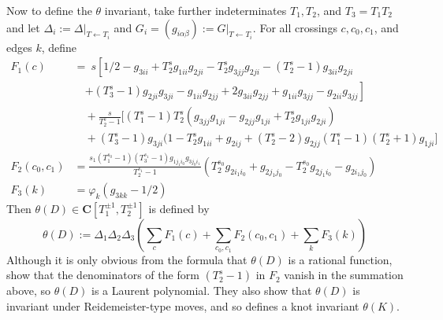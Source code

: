 \documentclass{amsart}
\begin{document}
Now to define the $\theta$ invariant, take further
indeterminates $T_1,T_2$, and $T_3=T_1T_2$ and let $\Delta_i:=\Delta|_{T\leftarrow T_i}$ and
$G_i=(g_{i\alpha\beta}):=G|_{T\leftarrow T_i}$. For all crossings $c,c_0,c_1$, and edges $k$, define
\begin{align*}
    F_1(c) &=\  s
    \left[1/2 - g_{3ii} +  T_2^s g_{1ii} g_{2ji} - T_2^s g_{3jj} g_{2ji}
      - (T_2^s-1) g_{3ii} g_{2ji} \right. \\
  \nonumber &\quad
    \left. + (T_3^s-1) g_{2ji} g_{3ji} - g_{1ii} g_{2jj} + 2 g_{3ii} g_{2jj}
      + g_{1ii} g_{3jj} - g_{2ii} g_{3jj} \right] \\
  \nonumber &\quad
  + \frac{s}{T_2^s-1}
    [
      (T_1^s-1)T_2^s \left( g_{3jj} g_{1ji} - g_{2jj} g_{1ji} + T_2^s g_{1ji} g_{2ji} \right) \\
  \nonumber &\quad
      + (T_3^s-1) g_{3ji} ( 1 - T_2^s g_{1ii} + g_{2ij} + (T_2^s-2) g_{2jj} 
         (T_1^s-1) (T_2^s+1) g_{1ji} ]\\
    F_2(c_0,c_1)&=\frac{s_1 (T_1^{s_0}-1) (T_3^{s_1}-1) g_{1j_1i_0} g_{3j_0i_1}}{T_2^{s_1}-1}(T_2^{s_0} g_{2i_1i_0}+g_{2j_1j_0} - T_2^{s_0} g_{2j_1i_0}
    -g_{2i_1j_0} )\\
    F_3(k)&=\varphi_k(g_{3kk}-1/2)
\end{align*}
Then $\theta(D)\in \mathbf C[T_1^{\pm1},T_2^{\pm1}]$ is defined by
\[\theta(D):=
\Delta_1\Delta_2\Delta_3\left(\sum_c F_1(c)+\sum_{c_0,c_1}F_2(c_0,c_1)+\sum_k F_3(k)\right)\]
Although it is only obvious from the formula that $\theta(D)$ is a rational
function, \cite{theta} show that the denominators of the form
$(T_2^s-1)$ in $F_2$ vanish in the summation above, so $\theta(D)$ is a Laurent polynomial. They also show
that $\theta(D)$ is invariant under Reidemeister-type moves, and so defines a knot invariant
$\theta(K)$.
\end{document}
